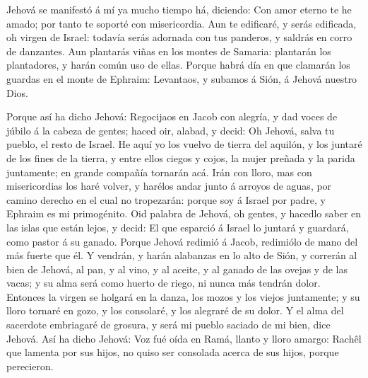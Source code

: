  Jehová se manifestó á mí ya mucho tiempo há, diciendo: Con
amor eterno te he amado; por tanto te soporté con misericordia.
 Aun te edificaré, y serás edificada, oh virgen de Israel:
todavía serás adornada con tus panderos, y saldrás en corro de
danzantes.  Aun plantarás viñas en los montes de Samaria:
plantarán los plantadores, y harán común uso de ellas. 
Porque habrá día en que clamarán los guardas en el monte de Ephraim:
Levantaos, y subamos á Sión, á Jehová nuestro Dios.

 Porque así ha dicho Jehová: Regocijaos en Jacob con
alegría, y dad voces de júbilo á la cabeza de gentes; haced oir, alabad,
y decid: Oh Jehová, salva tu pueblo, el resto de Israel.  He
aquí yo los vuelvo de tierra del aquilón, y los juntaré de los fines de
la tierra, y entre ellos ciegos y cojos, la mujer preñada y la parida
juntamente; en grande compañía tornarán acá.  Irán con
lloro, mas con misericordias los haré volver, y harélos andar junto á
arroyos de aguas, por camino derecho en el cual no tropezarán: porque
soy á Israel por padre, y Ephraim es mi primogénito.  Oid
palabra de Jehová, oh gentes, y hacedlo saber en las islas que están
lejos, y decid: El que esparció á Israel lo juntará y guardará, como
pastor á su ganado.  Porque Jehová redimió á Jacob,
redimiólo de mano del más fuerte que él.  Y vendrán, y
harán alabanzas en lo alto de Sión, y correrán al bien de Jehová, al
pan, y al vino, y al aceite, y al ganado de las ovejas y de las vacas; y
su alma será como huerto de riego, ni nunca más tendrán dolor.
 Entonces la virgen se holgará en la danza, los mozos y los
viejos juntamente; y su lloro tornaré en gozo, y los consolaré, y los
alegraré de su dolor.  Y el alma del sacerdote embriagaré
de grosura, y será mi pueblo saciado de mi bien, dice Jehová.
 Así ha dicho Jehová: Voz fué oída en Ramá, llanto y lloro
amargo: Rachêl que lamenta por sus hijos, no quiso ser consolada acerca
de sus hijos, porque perecieron.

